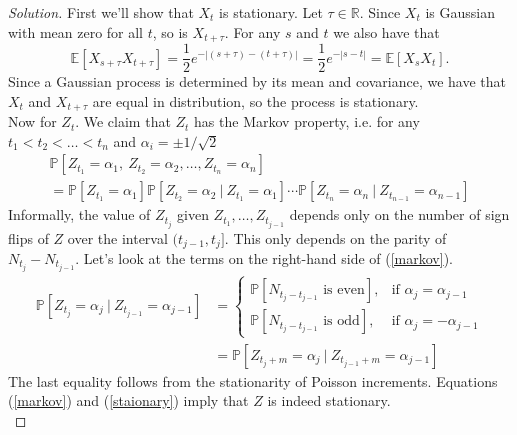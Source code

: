 \documentclass[11pt,letterpaper]{report}
\newcommand{\reals}{\mathbb{R}}
\newcommand{\E}{\mathbb{E}}
\newcommand{\Prob}{\mathbb{P}}
\newenvironment{solution}
{\begin{proof}[Solution]}
{\end{proof}}
\begin{document}
\begin{solution}
	First we'll show that $X_t$ is stationary. Let $\tau\in \reals$. Since $X_t$ is Gaussian with mean zero for all $t$, so is $X_{t+\tau}$. For any $s$ and $t$ we also have that
	\[
	\E[X_{s+\tau}X_{t+\tau}] = \frac{1}{2}e^{-|(s+\tau)-(t+\tau)|} = \frac{1}{2}e^{-|s-t|} = \E[X_sX_t].
	\]
	Since a Gaussian process is determined by its mean and covariance, we have that $X_t$ and $X_{t+\tau}$ are equal in distribution, so the process is stationary.\\

	\noindent Now for $Z_t$. We claim that $Z_t$ has the Markov property, i.e. for any $t_1 < t_2< \ldots <t_n$ and $\alpha_i = \pm 1/\sqrt{2}$
	\begin{multline}\label{markov}
		\Prob[Z_{t_1} = \alpha_1,\ Z_{t_2} = \alpha_2, \ldots, Z_{t_n} = \alpha_n] \\= \Prob[Z_{t_1} = \alpha_1]\Prob[Z_{t_2} = \alpha_2\ |\ Z_{t_1} = \alpha_1]\cdots \Prob[Z_{t_n} = \alpha_n\ |\ Z_{t_{n-1}} = \alpha_{n-1}]
	\end{multline}
	Informally, the value of $Z_{t_j}$ given $Z_{t_1}, \ldots, Z_{t_{j-1}}$ depends only on the number of sign flips of $Z$ over the interval $(t_{j-1}, t_j]$. This only depends on the parity of $N_{t_j} - N_{t_{j-1}}$. Let's look at the terms on the right-hand side of (\ref{markov}).
	\begin{equation}\label{staionary}
	\begin{split}
		\Prob[Z_{t_j} = \alpha_j\ |\ Z_{t_{j-1}} = \alpha_{j-1}] &= \begin{cases}
			\Prob[N_{t_j-t_{j-1}}\text{ is even}],&\text{if }\alpha_j = \alpha_{j-1}\\
			\Prob[N_{t_j-t_{j-1}}\text{ is odd}],&\text{if }\alpha_j = -\alpha_{j-1}
		\end{cases}\\ &= \Prob[Z_{t_j+m} = \alpha_j\ |\ Z_{t_{j-1}+m} = \alpha_{j-1}]
	\end{split}
	\end{equation}
	The last equality follows from the stationarity of Poisson increments. Equations (\ref{markov}) and (\ref{staionary}) imply that $Z$ is indeed stationary.\\


\end{solution}
\end{document}
